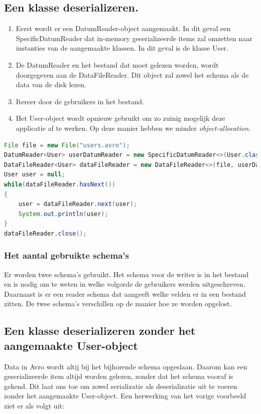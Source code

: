 \documentclass[a4paper,10pt,twoside]{report}
\begin{document}
\subsection{Een klasse deserializeren.}

\begin{enumerate}
	\item Eerst wordt er een DatumReader-object aangemaakt. In dit geval een SpecificDatumReader dat in-memory geserializeerde items zal omzetten naar instanties van de aangemaakte klassen. In dit geval is de klasse User.
	\item De DatumReader en het bestand dat moet gelezen worden, wordt doorgegeven aan de DataFileReader. Dit object zal zowel het schema als de data van de disk lezen.
	\item Itereer door de gebruikers in het bestand.
	\item Het User-object wordt opnieuw gebruikt om zo zuinig mogelijk deze applicatie af te werken. Op deze manier hebben we minder \textit{object-allocation}. 
\end{enumerate}

\begin{lstlisting}[language=Java]
File file = new File("users.avro");
DatumReader<User> userDatumReader = new SpecificDatumReader<>(User.class);
DataFileReader<User> dataFileReader = new DataFileReader<>(file, userDatumReader);
User user = null;
while(dataFileReader.hasNext())
{
	user = dataFileReader.next(user);
	System.out.println(user);
}
dataFileReader.close();
\end{lstlisting}

\subsubsection{Het aantal gebruikte schema's}

Er worden twee schema's gebruikt. Het schema voor de writer is in het bestand en is nodig om te weten in welke volgorde de gebruikers werden uitgeschreven. Daarnaast is er een reader schema dat aangeeft welke velden er in een bestand zitten. De twee schema's verschillen op de manier hoe ze worden opgelost.

\subsection{Een klasse deserializeren zonder het aangemaakte User-object}

Data in Avro wordt altij bij het bijhorende schema opgeslaan. Daarom kan een geserializeerde item altijd worden gelezen, zonder dat het schema vooraf is gekend. Dit laat ons toe om zowel serializatie als deserializatie uit te voeren zonder het aangemaakte User-object. Een herwerking van het vorige voorbeeld ziet er als volgt uit:
\end{document}
